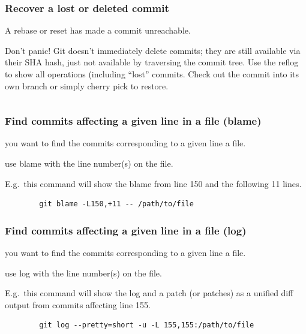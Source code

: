 \begin{frame}[fragile]
    \frametitle{Recover a lost or deleted commit}
     A rebase or reset has made a commit unreachable.

     Don't panic! Git doesn't immediately delete commits;
    they are still available via their SHA hash, just not available by
    traversing the commit tree.  Use the reflog to show all operations
    (including ``lost'' commits.  Check out the commit into its own branch
    or simply cherry pick to restore.

    \inputminted{bash}{recover-lost-or-deleted-commit.txt}

\end{frame}

\begin{frame}[fragile]
    \frametitle{Find commits affecting a given line in a file (blame)}

     you want to find the commits corresponding to a given
    line a file.

     use blame with the line number(s) on the file.

E.g.\ this command will show the blame from line 150 and the following 11 lines.
    \begin{verbatim}
        git blame -L150,+11 -- /path/to/file
    \end{verbatim}

\end{frame}

\begin{frame}[fragile]
    \frametitle{Find commits affecting a given line in a file (log)}

     you want to find the commits corresponding to a given
    line a file.

     use log with the line number(s) on the file.

    E.g.\ this command will show the log and a patch (or patches) as a unified diff
    output from commits affecting line 155.
    \begin{verbatim}
        git log --pretty=short -u -L 155,155:/path/to/file
    \end{verbatim}

\end{frame}

